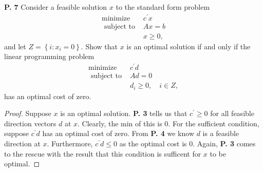 \documentclass{article}
\begin{document}
\begin{jacklist}
\newpage
    \begin{framed} 
    \item [\textbf{P. 7}] Consider a feasible solution $x$ to the standard form problem 
        \begin{align*}
            \text{minimize } & c^{\prime} x \\
            \text { subject to } & A x=b \\
            & x \geq 0,
        \end{align*}
        and let $Z=\left\{i: x_{i}=0\right\}$. Show that $x$ is an optimal solution if and only if the linear programming problem
        \begin{align*}
            \text{minimize } & c^{\prime} d \\
            \text { subject to } & A d=0 \quad \\
            & d_{i} \geq 0, \quad i \in Z,
        \end{align*}
        has an optimal cost of zero.
    \end{framed}
    \begin{proof}
        Suppose $x$ is an optimal solution. \textbf{P. 3} tells us that $c^\prime \geq 0$ for all feasible direction vectors $d$ at $x$.
        Clearly, the min of this is 0. For the sufficient condition, suppose $c^\prime d$ has  an optimal cost of zero. From 
        \textbf{P. 4} we know $d$ is a feasible direction at $x$. Furthermore, $c^\prime d \leq 0$ as the optimal cost is 0. Again,
        \textbf{P. 3} comes to the rescue with the result that this condition is sufficent for $x$ to be optimal. 
    \end{proof}


\end{jacklist}
\end{document}
